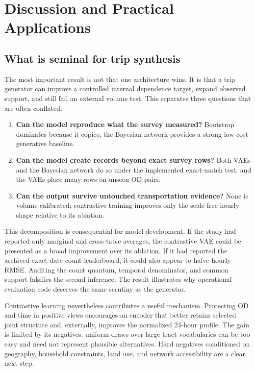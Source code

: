 \documentclass[numbered]{trbunofficial}
\begin{document}
\FloatBarrier
\section{Discussion and Practical Applications}

\subsection{What is seminal for trip synthesis}

The most important result is not that one architecture wins. It is that a trip generator can improve a controlled internal dependence target, expand observed support, and still fail an external volume test. This separates three questions that are often conflated:

\begin{enumerate}[leftmargin=0.27in,itemsep=2pt,topsep=3pt]
\item \textbf{Can the model reproduce what the survey measured?} Bootstrap dominates because it copies; the Bayesian network provides a strong low-cost generative baseline.
\item \textbf{Can the model create records beyond exact survey rows?} Both VAEs and the Bayesian network do so under the implemented exact-match test, and the VAEs place many rows on unseen OD pairs.
\item \textbf{Can the output survive untouched transportation evidence?} None is volume-calibrated; contrastive training improves only the scale-free hourly shape relative to its ablation.
\end{enumerate}

This decomposition is consequential for model development. If the study had reported only marginal and cross-table averages, the contrastive VAE could be presented as a broad improvement over its ablation. If it had reported the archived exact-date count leaderboard, it could also appear to halve hourly RMSE. Auditing the count quantum, temporal denominator, and common support falsifies the second inference. The result illustrates why operational evaluation code deserves the same scrutiny as the generator.

Contrastive learning nevertheless contributes a useful mechanism. Protecting OD and time in positive views encourages an encoder that better retains selected joint structure and, externally, improves the normalized 24-hour profile. The gain is limited by its negatives: uniform draws over large tract vocabularies can be too easy and need not represent plausible alternatives. Hard negatives conditioned on geography, household constraints, land use, and network accessibility are a clear next step.
\end{document}
